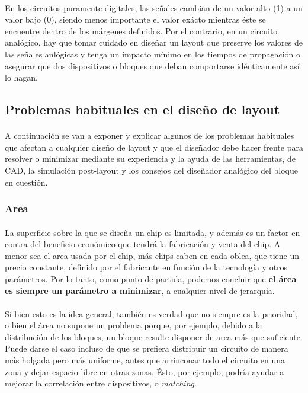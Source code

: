 \paragraph{} En los circuitos puramente digitales, las señales cambian de un
valor alto (1) a un valor bajo (0), siendo menos importante el valor exácto
mientras éste se encuentre dentro de los márgenes definidos. Por el contrario,
en un circuito analógico, hay que tomar cuidado en diseñar un layout que preserve
los valores de las señales anlógicas y tenga un impacto mínimo en los tiempos de
propagación o asegurar que dos dispositivos o bloques que deban comportarse idénticamente
así lo hagan.

\subsection{Problemas habituales en el diseño de layout}

\paragraph{} A continuación se van a exponer y explicar algunos de los problemas habituales que
afectan a cualquier diseño de layout y que el diseñador debe hacer frente para
resolver o minimizar mediante su experiencia y la ayuda de las herramientas, de CAD,
la simulación post-layout y los consejos del diseñador analógico del bloque en cuestión.

\subsubsection{Area}

\paragraph{} La superficie sobre la que se diseña un chip es limitada, y además es
un factor en contra del beneficio económico que tendrá la fabricación y venta del
chip. A menor sea el area usada por el chip, más chips caben en cada oblea, que tiene
un precio constante, definido por el fabricante en función de la tecnología y otros
parámetros. Por lo tanto, como punto de partida, podemos concluir que \textbf{el área
es siempre un parámetro a minimizar}, a cualquier nivel de jerarquía.

\paragraph{} Si bien esto es la idea general, también es verdad que no siempre es
la prioridad, o bien el área no supone un problema porque, por ejemplo, debido a la
distribución de los bloques, un bloque resulte disponer de area más que suficiente.
Puede darse el caso incluso de que se prefiera distribuir un circuito de manera más
holgada pero más uniforme, antes que arrinconar todo el circuito en una zona y dejar
espacio libre en otras zonas. Ésto, por ejemplo, podría ayudar a mejorar la correlación
entre dispositivos, o \textit{matching}.

